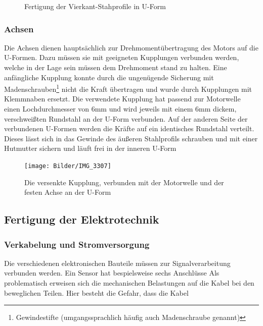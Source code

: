 \documentclass[a4paper, 12pt, bibtotocnumbered, liststotocnumbered]{scrartcl}
\begin{document}
	\begin{figure}[htb]
		\centering
		\hfill
		\caption{Fertigung der Vierkant-Stahprofile in U-Form}
	\end{figure}

	\subsubsection{Achsen}
	Die Achsen dienen hauptsächlich zur Drehmomentübertragung des Motors auf die U-Formen. Dazu müssen sie mit geeigneten Kupplungen verbunden werden, welche in der Lage sein müssen dem Drehmoment stand zu halten. Eine anfängliche Kupplung konnte durch die ungenügende Sicherung mit Madenschrauben\footnote{Gewindestifte (umgangssprachlich häufig auch Madenschraube genannt)} nicht die Kraft übertragen und wurde durch Kupplungen mit Klemmnaben ersetzt. Die verwendete Kupplung hat passend zur Motorwelle einen Lochdurchmesser von 6mm und wird jeweils mit einem 6mm dickem, verschweißten Rundstahl an der U-Form verbunden. Auf der anderen Seite der verbundenen U-Formen werden die Kräfte auf ein identisches Rundstahl verteilt. Dieses lässt sich in das Gewinde des äußeren Stahlprofils schrauben und mit einer Hutmutter sichern und läuft frei in der inneren U-Form

	\begin{figure}[htb]
		\centering
		\texttt{[image: Bilder/IMG\_3307]}
		\caption{Die versenkte Kupplung, verbunden mit der Motorwelle und der festen Achse an der U-Form}
	\end{figure}

	\subsection{Fertigung der Elektrotechnik}
	\subsubsection{Verkabelung und Stromversorgung}
	Die verschiedenen elektronischen Bauteile müssen zur Signalverarbeitung verbunden werden. Ein Sensor hat bespielsweise sechs Anschlüsse Als problematisch erweisen sich die mechanischen Belastungen auf die Kabel bei den beweglichen Teilen. Hier besteht die Gefahr, dass die Kabel
\end{document}
